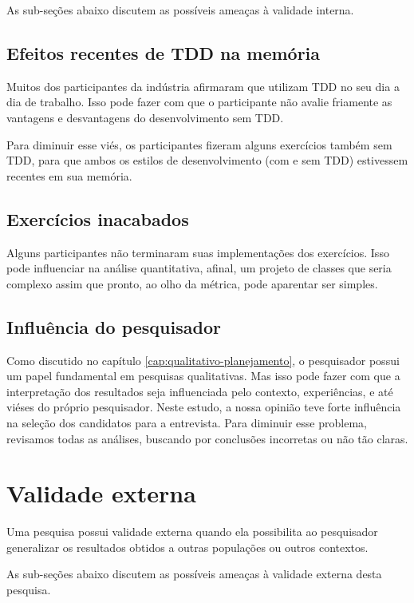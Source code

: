 As sub-seções abaixo discutem as possíveis ameaças à validade interna.

\subsection{Efeitos recentes de TDD na memória}

Muitos dos participantes da indústria afirmaram que utilizam TDD no seu dia a dia de trabalho.
Isso pode fazer com que o participante
não avalie friamente as vantagens e desvantagens do desenvolvimento sem TDD.

Para diminuir esse viés, os participantes fizeram alguns exercícios também
sem TDD, para que ambos os estilos de desenvolvimento (com e sem TDD) estivessem
recentes em sua memória.

\subsection{Exercícios inacabados}

Alguns participantes não terminaram suas implementações dos exercícios. Isso
pode influenciar na análise quantitativa, afinal, um projeto de classes que
seria complexo assim que pronto, ao olho da métrica, pode aparentar ser simples.

\subsection{Influência do pesquisador}

Como discutido no capítulo \ref{cap:qualitativo-planejamento}, o pesquisador possui
um papel fundamental em pesquisas qualitativas. Mas isso pode fazer com que
a interpretação dos resultados seja influenciada pelo contexto, experiências,
e até viéses do próprio pesquisador.
Neste estudo, a nossa opinião teve forte influência na seleção dos candidatos
para a entrevista.
Para diminuir esse problema, revisamos todas as análises,
buscando por conclusões incorretas ou não tão claras. 

\section{Validade externa}

Uma pesquisa possui validade externa quando ela possibilita ao pesquisador 
generalizar os resultados obtidos a outras populações ou outros contextos.

As sub-seções abaixo discutem as possíveis ameaças à validade externa
desta pesquisa.


